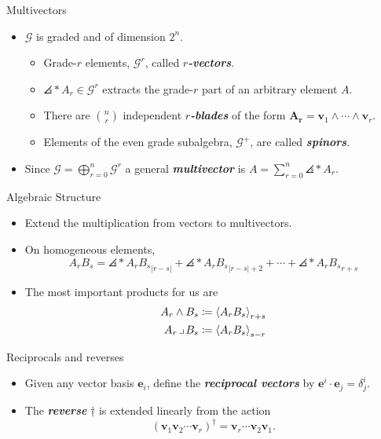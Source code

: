 \documentclass[aspectratio=169]{beamer}
\newcommand\boldgreen[1]{\textcolor{lighter_csu_green}{\emph{\textbf{#1}}}}
\newcommand{\G}{\mathcal{G}}
\newcommand{\blade}[1]{\boldsymbol{#1}}
\newcommand{\contract}{\hspace*{.5mm} \lrcorner \hspace*{.5mm}}
\DeclarePairedDelimiter\angles{\langle}{\rangle}
\newcommand{\proj}[2]{\angles*{#2}_{#1}}
\begin{document}
\begin{frame}{Multivectors}
\vfill
\begin{itemize}
    \pause
        \item $\G$ is graded and of dimension $2^n$.
    \begin{itemize}
        \pause
        \item Grade-$r$ elements, $\G^r$, called \boldgreen{$r$-vectors}.
        \pause
        \item $\proj{r}{A}\in \G^r$ extracts the grade-$r$ part of an arbitrary element $A$.
        \pause
        \item There are ${n \choose r}$ independent \boldgreen{$r$-blades} of the form $\blade{A_r}=\blade{v}_1 \wedge \cdots \wedge\blade{v}_r$.
        \pause
        \item Elements of the even grade subalgebra, $\G^+$, are called \boldgreen{spinors}.
    \end{itemize}
        \pause
        \item Since $\displaystyle{\G=\bigoplus_{r=0}^n \G^r}$ a general \boldgreen{multivector} is $\displaystyle{A = \sum_{r=0}^n \proj{r}{A}}$.
\end{itemize}

\begin{figure}[H]
    \centering
    \def\svgwidth{\columnwidth}
\resizebox{.8\textwidth}{!}{}
\end{figure}
\vfill
\end{frame}

\begin{frame}{Algebraic Structure}
\vfill
\begin{itemize}
\pause
\item Extend the multiplication from vectors to multivectors.
\pause
\item On homogeneous elements,
\[
A_r B_s = \proj{|r-s|}{A_r B_s} + \proj{|r-s|+2}{A_r B_s} + \cdots + \proj{r+s}{A_r B_s}
\]
\pause
\item The most important products for us are
\begin{align*}
A_r \wedge B_s &\coloneqq \proj{r+s}{A_r B_s}\\
{A_r} \contract B_s &\coloneqq \proj{s-r}{A_r B_s}
\end{align*}
\end{itemize}
\vfill
\end{frame}

\begin{frame}{Reciprocals and reverses}
\vfill
\begin{itemize}
\pause
\item Given any vector basis $\blade{e}_i$, define the \boldgreen{reciprocal vectors} by $\blade{e}^i\cdot \blade{e}_j = \delta^i_j$.
\pause
\item The \boldgreen{reverse} $\dagger$ is extended linearly from the action
\[
(\blade{v}_1 \blade{v}_2 \cdots \blade{v}_r)^\dagger = \blade{v}_r \cdots \blade{v}_2  \blade{v}_1.
\]
\end{itemize}
\vfill
\end{frame}
\end{document}
